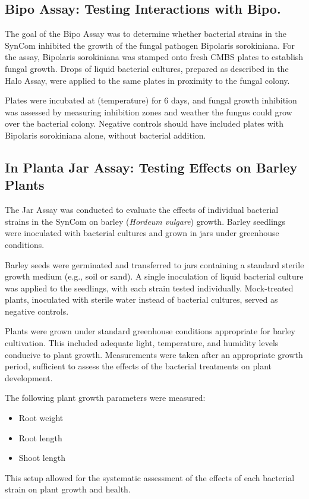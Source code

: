 \subsection{Bipo Assay: Testing Interactions with Bipo.}
The goal of the Bipo Assay was to determine whether bacterial strains in the \ac{SynCom} inhibited the growth of the fungal pathogen Bipolaris sorokiniana. For the assay, Bipolaris sorokiniana was stamped onto fresh CMBS plates to establish fungal growth. Drops of liquid bacterial cultures, prepared as described in the Halo Assay, were applied to the same plates in proximity to the fungal colony.

Plates were incubated at (temperature) for 6 days, and fungal growth inhibition was assessed by measuring inhibition zones and weather the fungus could grow over the bacterial colony. Negative controls should have included plates with Bipolaris sorokiniana alone, without bacterial addition.

\subsection{In Planta Jar Assay: Testing Effects on Barley Plants}
The Jar Assay was conducted to evaluate the effects of individual bacterial strains in the \ac{SynCom} on barley (\textit{Hordeum vulgare}) growth. Barley seedlings were inoculated with bacterial cultures and grown in jars under greenhouse conditions.

Barley seeds were germinated and transferred to jars containing a standard sterile growth medium (e.g., soil or sand). A single inoculation of liquid bacterial culture was applied to the seedlings, with each strain tested individually. Mock-treated plants, inoculated with sterile water instead of bacterial cultures, served as negative controls.

Plants were grown under standard greenhouse conditions appropriate for barley cultivation. This included adequate light, temperature, and humidity levels conducive to plant growth. Measurements were taken after an appropriate growth period, sufficient to assess the effects of the bacterial treatments on plant development.

The following plant growth parameters were measured:
\begin{itemize}
    \item Root weight
    \item Root length
    \item Shoot length
\end{itemize}

This setup allowed for the systematic assessment of the effects of each bacterial strain on plant growth and health.
